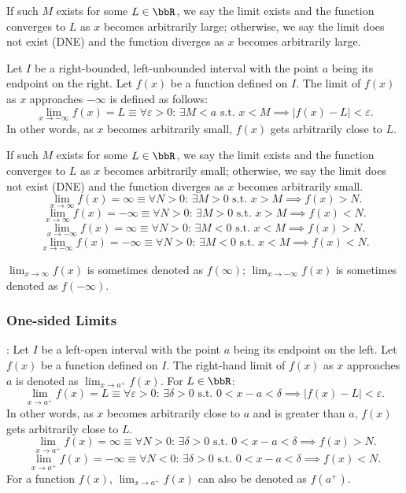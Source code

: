 If such $M$ exists for some $L\in\bbR$, we say the limit exists and the function converges to $L$ as \(x\) becomes arbitrarily large; otherwise, we say the limit does not exist (DNE) and the function diverges as \(x\) becomes arbitrarily large.

Let \(I\) be a right-bounded, left-unbounded interval with the point \(a\) being its endpoint on the right. Let \( f(x) \) be a function defined on \(I\). The limit of \( f(x) \) as \( x \) approaches \( -\infty \) is defined as follows:
\[\lim_{x \to -\infty} f(x) = L \equiv \forall \varepsilon > 0: \, \exists M < a \text{\ s.t.\ } x < M \implies |f(x) - L| < \varepsilon.\]
In other words, as \(x\) becomes arbitrarily small, \(f(x)\) gets arbitrarily close to \(L\).

If such $M$ exists for some $L\in\bbR$, we say the limit exists and the function converges to $L$ as \(x\) becomes arbitrarily small; otherwise, we say the limit does not exist (DNE) and the function diverges as \(x\) becomes arbitrarily small.
\[\lim_{x\to\infty}f(x)=\infty \equiv \forall N > 0:\, \exists M > 0 \text{\ s.t.\ } x > M \implies f(x) > N.\]
\[\lim_{x\to\infty}f(x)=-\infty \equiv \forall N > 0:\, \exists M > 0 \text{\ s.t.\ } x > M \implies f(x) < N.\]
\[\lim_{x\to-\infty}f(x)=\infty \equiv \forall N > 0:\, \exists M < 0 \text{\ s.t.\ } x < M \implies f(x) > N.\]
\[\lim_{x\to-\infty}f(x)=-\infty \equiv \forall N > 0:\, \exists M < 0 \text{\ s.t.\ } x < M \implies f(x) < N.\]

$\lim_{x\to\infty}f(x)$ is sometimes denoted as $f(\infty)$; $\lim_{x\to-\infty}f(x)$ is sometimes denoted as $f(-\infty)$.
\subsubsection{One-sided Limits}
: Let \(I\) be a left-open interval with the point \(a\) being its endpoint on the left. Let \( f(x) \) be a function defined on \(I\). The right-hand limit of \( f(x) \) as \( x \) approaches \( a \) is denoted as $\lim_{x \to a^+} f(x)$. For $L\in\bbR$:
\[\lim_{x \to a^+} f(x) = L \equiv \forall \varepsilon > 0 :\,\exists \delta > 0 \text{\ s.t.\ } 0 < x - a < \delta \implies |f(x) - L| < \varepsilon.\]
In other words, as \(x\) becomes arbitrarily close to \(a\) and is greater than \(a\), \(f(x)\) gets arbitrarily close to \(L\).
\[\lim_{x\to a^+}f(x)=\infty \equiv \forall N > 0:\, \exists \delta > 0 \text{\ s.t.\ } 0 < x - a < \delta \implies f(x) > N.\]
\[\lim_{x\to a^+}f(x)=-\infty \equiv \forall N < 0:\, \exists \delta > 0 \text{\ s.t.\ } 0 < x - a < \delta \implies f(x) < N.\]
For a function $f(x)$, $\lim_{x\to a^+}f(x)$ can also be denoted as $f(a^+)$.


